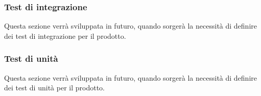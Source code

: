 \renewcommand{\arraystretch}{1}
\subsubsection{Test di integrazione}
Questa sezione verrà sviluppata in futuro, quando sorgerà la necessità di definire dei test di integrazione per il prodotto.
\subsubsection{Test di unità}
Questa sezione verrà sviluppata in futuro, quando sorgerà la necessità di definire dei test di unità per il prodotto.



\pagebreak